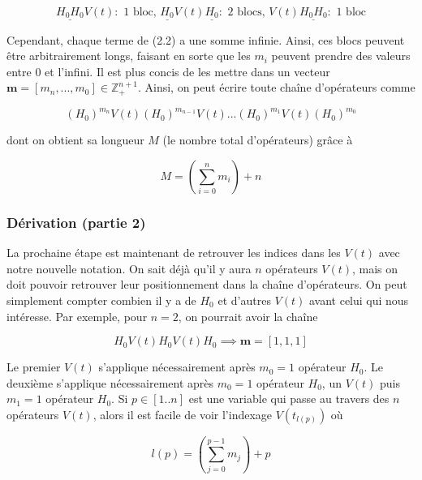 \begin{equation*}
    \underline{H_0H_0}V(t) : \text{ 1 bloc, } \underline{H_0}V(t)\underline{H_0} : \text{ 2 blocs, } V(t)\underline{H_0H_0} : \text{ 1 bloc}
\end{equation*}



Cependant, chaque terme de (2.2) a une somme infinie. Ainsi, ces blocs peuvent être arbitrairement longs, faisant en sorte que les $m_i$ peuvent prendre des valeurs entre 0 et l'infini. Il est plus concis de les mettre dans un vecteur $\boldsymbol{m} = \left[m_n, ..., m_0\right] \in \mathbb{Z}^{n+1}_+$. Ainsi, on peut écrire toute chaîne d'opérateurs comme 

\begin{equation}
    (H_0)^{m_n}V(t)(H_0)^{m_{n-1}}V(t)...(H_0)^{m_1}V(t)(H_0)^{m_0}
\end{equation}

dont on obtient sa longueur $M$ (le nombre total d'opérateurs) grâce à 

\begin{equation}
    M = \left(\sum_{i=0}^{n}m_i\right) + n
\end{equation}

\subsubsection{Dérivation (partie 2)}
La prochaine étape est maintenant de retrouver les indices dans les $V(t)$ avec notre nouvelle notation. On sait déjà qu'il y aura $n$ opérateurs $V(t)$, mais on doit pouvoir retrouver leur positionnement dans la chaîne d'opérateurs. On peut simplement compter combien il y a de $H_0$ et d'autres $V(t)$ avant celui qui nous intéresse. Par exemple, pour $n=2$, on pourrait avoir la chaîne

\begin{equation*}
    H_0V(t)H_0V(t)H_0 \implies \boldsymbol{m} = \left[1, 1, 1\right]
\end{equation*}

Le premier $V(t)$ s'applique nécessairement après $m_0 = 1$ opérateur $H_0$. Le deuxième s'applique nécessairement après $m_0 = 1$ opérateur $H_0$, un $V(t)$ puis $m_1 = 1$ opérateur $H_0$. Si $p \in \left[1..n\right]$ est une variable qui passe au travers des $n$ opérateurs $V(t)$, alors il est facile de voir l'indexage $V(t_{l(p)})$ où

\begin{equation}
    l(p) = \left(\sum_{j=0}^{p-1}m_j\right) + p
\end{equation}

